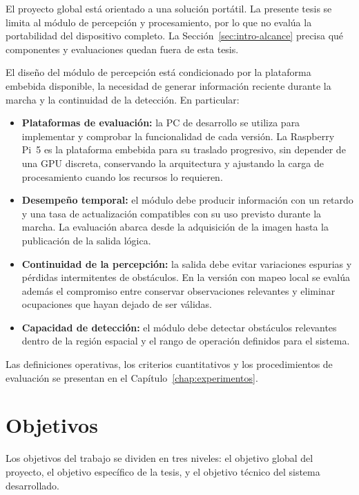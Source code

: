 El proyecto global está orientado a una solución portátil. La presente tesis se limita al módulo
de percepción y procesamiento, por lo que no evalúa la portabilidad del dispositivo completo.
La Sección~\ref{sec:intro-alcance} precisa qué componentes y evaluaciones quedan fuera de esta tesis.

El diseño del módulo de percepción está condicionado por la plataforma embebida disponible, la
necesidad de generar información reciente durante la marcha y la continuidad de la detección. En
particular:
\begin{itemize}
  \item \textbf{Plataformas de evaluación:} la PC de desarrollo se utiliza para implementar y
        comprobar la funcionalidad de cada versión. La Raspberry Pi~5 \cite{RaspberryPi} es la
        plataforma embebida para su traslado progresivo, sin depender de una GPU discreta,
        conservando la arquitectura y ajustando la carga de procesamiento cuando los recursos lo
        requieren.
  \item \textbf{Desempeño temporal:} el módulo debe producir información con un retardo y una
        tasa de actualización compatibles con su uso previsto durante la marcha. La evaluación
        abarca desde la adquisición de la imagen hasta la publicación de la salida lógica.
  \item \textbf{Continuidad de la percepción:} la salida debe evitar variaciones espurias y
        pérdidas intermitentes de obstáculos. En la versión con mapeo local se evalúa además el
        compromiso entre conservar observaciones relevantes y eliminar ocupaciones que hayan
        dejado de ser válidas.
  \item \textbf{Capacidad de detección:} el módulo debe detectar obstáculos relevantes dentro de
        la región espacial y el rango de operación definidos para el sistema.
\end{itemize}

Las definiciones operativas, los criterios cuantitativos y los procedimientos de evaluación se
presentan en el Capítulo~\ref{chap:experimentos}.

\section{Objetivos}

Los objetivos del trabajo se dividen en tres niveles: el objetivo global del proyecto, el objetivo
específico de la tesis, y el objetivo técnico del sistema desarrollado.

